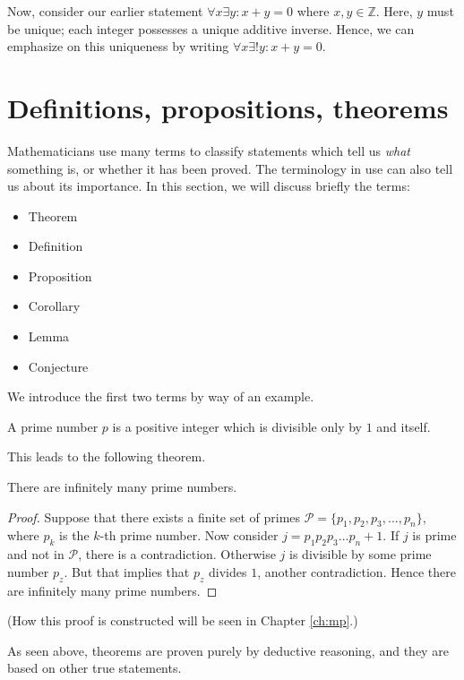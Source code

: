 Now, consider our earlier statement $\forall x \exists y : x + y = 0$ where $x,y\in\mathbb{Z}$. Here, $y$ must be unique; each integer
possesses a unique additive inverse. Hence, we can emphasize on this uniqueness by writing $\forall x \exists! y :
x + y = 0$.

\section{Definitions, propositions, theorems}
Mathematicians use many terms to classify statements which tell us \textit{what}
something is, or whether it has been proved. The terminology in use can also tell us about its
importance. In this section, we will discuss briefly the terms:
\begin{itemize}
    \item Theorem
    \item Definition
    \item Proposition
    \item Corollary
    \item Lemma
    \item Conjecture
\end{itemize}

We introduce the first two terms by way of an example.
\begin{definition}
    A prime number $p$ is a positive integer which is divisible only by $1$ and itself.
\end{definition}

This leads to the following theorem.

\begin{theorem}[Euclid]
    There are infinitely many prime numbers.
\end{theorem}
\begin{proof}
    Suppose that there exists a finite set of primes $\mathcal{P} = \{p_1,p_2,p_3,...,p_n\}$,
    where $p_k$ is the $k$-th prime number. Now consider $j = p_1 p_2 p_3 ... p_n + 1$. If $j$ is prime
    and not in $\mathcal{P}$, there is a contradiction. Otherwise $j$ is divisible by some prime number $p_z$.
    But that implies that $p_z$ divides $1$, another contradiction. Hence there are infinitely many prime numbers.
\end{proof}

(How this proof is constructed will be seen in Chapter \ref{ch:mp}.)

As seen above, theorems are proven purely by deductive reasoning, and they are based on other true
statements.

